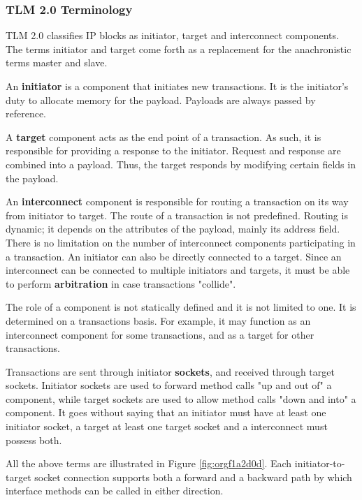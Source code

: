 \documentclass[11pt]{article}
\begin{document}
\subsubsection{TLM 2.0 Terminology}
\label{sec:org1e385b1}
TLM 2.0 classifies IP blocks as initiator, target and interconnect components.
The terms initiator and target come forth as a replacement for the anachronistic terms master and slave.

An \textbf{initiator} is a component that initiates new transactions.
It is the initiator's duty to allocate memory for the payload.
Payloads are always passed by reference.

A \textbf{target} component acts as the end point of a transaction. 
As such, it is responsible for providing a response to the initiator.
Request and response are combined into a payload.
Thus, the target responds by modifying certain fields in the payload.

An \textbf{interconnect} component is responsible for routing a transaction on its way from initiator to target.
The route of a transaction is not predefined.
Routing is dynamic; it depends on the attributes of the payload, mainly its address field.
There is no limitation on the number of interconnect components participating in a transaction. 
An initiator can also be directly connected to a target.
Since an interconnect can be connected to multiple initiators and targets, it must be able to perform \textbf{arbitration} in case transactions "collide".

The role of a component is not statically defined and it is not limited to one.
It is determined on a transactions basis. 
For example, it may function as an interconnect component for some transactions, and as a target for other transactions.

Transactions are sent through initiator \textbf{sockets}, and received through target sockets.
Initiator sockets are used to forward method calls "up and out of" a component, while target sockets are used to allow method calls "down and into" a component.
It goes without saying that an initiator must have at least one initiator socket, a target at least one target socket and a interconnect must possess both.

All the above terms are illustrated in Figure \ref{fig:orgf1a2d0d}.
Each initiator-to-target socket connection supports both a forward and a backward path by which interface methods can be called in either direction.
\end{document}
